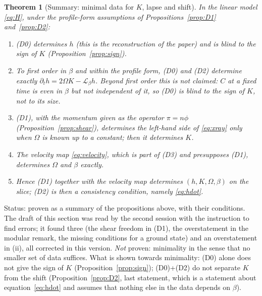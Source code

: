 \documentclass[a4paper,11pt]{article}
\newtheorem{theorem}{Theorem}[section]
\theoremstyle{definition}
\theoremstyle{remark}
\newcommand{\Lie}{\mathcal{L}}
\newcommand{\status}[1]{\par\noindent\textsf{\small Status: #1}\par}
\begin{document}
\begin{theorem}[Summary: minimal data for $K$, lapse and shift]\label{thm:summary}
In the linear model \eqref{eq:H}, under the profile-form assumptions of Propositions~\ref{prop:D1} and~\ref{prop:D2}:
\begin{enumerate}[label=\textup{(\roman*)}]
\item \textup{(D0)} determines $h$ (this is the reconstruction of the paper) and is blind to the sign of $K$ (Proposition~\ref{prop:sign}).
\item To first order in $\beta$ and within the profile form, \textup{(D0)} and \textup{(D2)} determine exactly $\partial_th=2\Omega K-\Lie_\beta h$. Beyond first order this is not claimed: $C$ at a fixed time is even in $\beta$ but not independent of it, so \textup{(D0)} is blind to the sign of $K$, not to its size.
\item \textup{(D1)}, with the momentum given as the operator $\pi=n\phi$ (Proposition~\ref{prop:shear}), determines the left-hand side of \eqref{eq:xray} only when $\Omega$ is known up to a constant; then it determines $K$.
\item The velocity map \eqref{eq:velocity}, which is part of \textup{(D3)} and presupposes \textup{(D1)}, determines $\Omega$ and $\beta$ exactly.
\item Hence \textup{(D1)} together with the velocity map determines $(h,K,\Omega,\beta)$ on the slice; \textup{(D2)} is then a consistency condition, namely \eqref{eq:hdot}.
\end{enumerate}
\end{theorem}
\status{proven as a summary of the propositions above, with their conditions. The draft of this section was read by the second session with the instruction to find errors; it found three (the shear freedom in (D1), the overstatement in the modular remark, the missing conditions for a ground state) and an overstatement in (ii), all corrected in this version. \emph{Not} proven: minimality in the sense that no smaller set of data suffices. What is shown towards minimality: (D0) alone does not give the sign of $K$ (Proposition~\ref{prop:sign}); (D0)+(D2) do not separate $K$ from the shift (Proposition~\ref{prop:D2}, last statement, which is a statement about equation~\eqref{eq:hdot} and assumes that nothing else in the data depends on $\beta$).}
\end{document}
